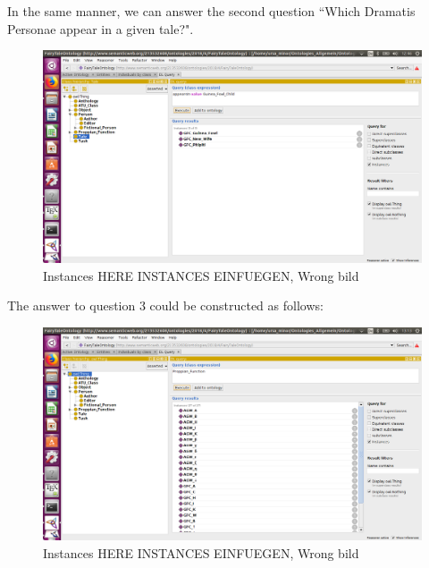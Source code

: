 \documentclass[10pt,a4paper]{article}
\begin{document}
In the same manner, we can answer the second question ``Which Dramatis Personae appear in a given tale?". 
\begin{figure}

\centering
 	\includegraphics[scale=0.2]{Screen7.png}
 	\caption{Instances HERE INSTANCES EINFUEGEN, Wrong bild}
\end{figure}
The answer to question 3 could be constructed as follows: 
\begin{figure}
\centering
 	\includegraphics[scale=0.2]{Screen8.png}
 	\caption{Instances HERE INSTANCES EINFUEGEN, Wrong bild}
\end{figure}
    
\end{document}
